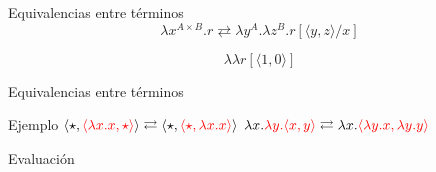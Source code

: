 \begin{frame}{Equivalencias entre términos}	
	\[ \lambda x^{A \times B}. r \rightleftarrows \lambda y^A. \lambda z^B. r[\langle y, z \rangle/x] \]

	\pause
	\[ \lambda \lambda r[\langle 1,0 \rangle] \]
	
	\pause
	
	\pause
	
\end{frame}

\begin{frame}{Equivalencias entre términos}	
\end{frame}

\begin{frame}{Ejemplo}
	$ \langle \star, \textcolor{red}{\langle \lambda x.x, \star \rangle} \rangle \rightleftarrows \langle \star, \textcolor{red}{\langle \star, \lambda x.x \rangle} \rangle $
	\pause
	$ \lambda x. \textcolor{red}{\lambda y. \langle x, y \rangle} \rightleftarrows \lambda x. \textcolor{red}{\langle \lambda y.x, \lambda y.y \rangle} $
\end{frame}

\iffalse
\begin{frame}{Evaluación}
\end{frame}

